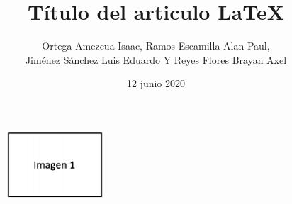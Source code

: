 \documentclass[letterpaper]{article} %
\title{Título del articulo \LaTeX} %
\author{Ortega Amezcua Isaac, Ramos Escamilla Alan Paul, \\
        Jiménez Sánchez Luis Eduardo Y Reyes Flores Brayan Axel} %
\date{12 junio 2020} %
\begin{document}
    \begin{figure}[!t] %
        \begin{center} 
        \centering  
            \includegraphics[scale=0.90]{imagenes/imagen1.png}
        \end{center}
    \end{figure}
    
    \maketitle %
    
      
    \renewcommand{\tablename}{Tabla} %

    
    

    
    
\end{document}
